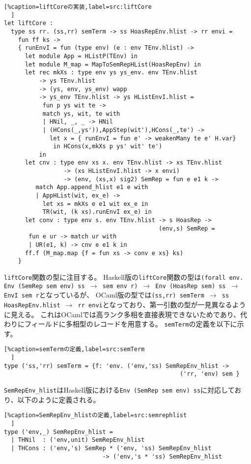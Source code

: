\documentclass[uplatex]{sumiilab-paper}
\theoremstyle{mystyle}
\numberwithin{definition}{chapter} %
\begin{document}
\begin{lstlisting}[%caption=liftCoreの実装,label=src:liftCore
  ]
let liftCore : 
  type ss rr. (ss,rr) semTerm -> ss HoasRepEnv.hlist -> rr envi = 
    fun ff ks -> 
    { runEnvI = fun (type env) (e : env TEnv.hlist) -> 
      let module App = HListP(TEnv) in
      let module M_map = MapToSemRepHList(HoasRepEnv) in  
      let rec mkXs : type env ys ys_env. env TEnv.hlist
          -> ys TEnv.hlist
          -> (ys, env, ys_env) wapp 
          -> ys_env TEnv.hlist -> ys HListEnvI.hlist =
           fun p ys wit te -> 
           match ys, wit, te with
           | HNil, _, _ -> HNil 
           | (HCons(_,ys')),AppStep(wit'),HCons(_,te') ->
             let x = { runEnvI = fun e' -> weakenMany te e' H.var} 
              in HCons(x,mkXs p ys' wit' te') 
          in                       
      let cnv : type env xs x. env TEnv.hlist -> xs TEnv.hlist 
                 -> (xs HListEnvI.hlist -> x envi)
                 -> (env, (xs,x) sig2) SemRep = fun e e1 k -> 
         match App.append_hlist e1 e with
         | AppHList(wit, ex_e) -> 
           let xs = mkXs e e1 wit ex_e in 
           TR(wit, (k xs).runEnvI ex_e) in 
      let conv : type env s. env TEnv.hlist -> s HoasRep -> 
                                            (env,s) SemRep =
       fun e ur -> match ur with 
       | UR(e1, k) -> cnv e e1 k in      
      ff.f (M_map.map {f = fun xs -> conv e xs} ks)
    }
\end{lstlisting} 

{\tt liftCore}関数の型に注目する。
Haskell版の{\tt liftCore}関数の型は{\tt (forall env. Env (SemRep sem env) ss $\rightarrow$ sem env r) $\rightarrow$ Env (HoasRep sem) ss $\rightarrow$ EnvI sem r}となっているが、
OCaml版の型では{\tt (ss,rr) semTerm $\rightarrow$ ss HoasRepEnv.hlist $\rightarrow$ rr envi}となっており、第一引数の型が一見異なるように見える。
これはOCamlでは高ランク多相を直接表現できないためであり、代わりにフィールドに多相型のレコードを用意する。
{\tt semTerm}の定義を以下に示す。

\begin{lstlisting}[%caption=semTermの定義,label=src:semTerm
  ]
type ('ss,'rr) semTerm = {f: 'env. ('env,'ss) SemRepEnv_hlist -> 
                                                  ('rr, 'env) sem }
\end{lstlisting}

{\tt SemRepEnv\_hlist}はHaskell版における{\tt Env (SemRep sem env) ss}に対応しており、以下のように定義される。

\begin{lstlisting}[%caption=SemRepEnv_hlistの定義,label=src:semrephlist
  ]
type ('env,_) SemRepEnv_hlist =
  | THNil  : ('env,unit) SemRepEnv_hlist
  | THCons : ('env,'s) SemRep * ('env, 'ss) SemRepEnv_hlist 
                            -> ('env,'s * 'ss) SemRepEnv_hlist
\end{lstlisting}
\end{document}
